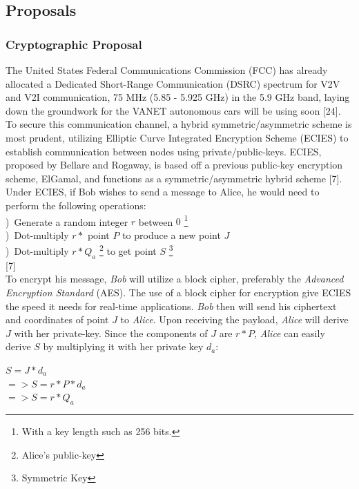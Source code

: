 \documentclass[conference,compsoc]{IEEEtran}
\begin{document}
\subsection{Proposals}
\subsubsection{Cryptographic Proposal}
The United States Federal Communications Commission (FCC) has already allocated a Dedicated Short-Range Communication (DSRC) spectrum for V2V and V2I communication, 75 MHz (5.85 - 5.925 GHz) in the 5.9 GHz band, laying down the groundwork for the VANET autonomous cars will be using soon [24]. To secure this communication channel, a hybrid symmetric/asymmetric scheme is most prudent, utilizing Elliptic Curve Integrated Encryption Scheme (ECIES) to establish communication between nodes using private/public-keys. ECIES, proposed by Bellare and Rogaway, is based off a previous public-key encryption scheme, ElGamal, and functions as a symmetric/asymmetric hybrid scheme [7]. Under ECIES, if Bob wishes to send a message to Alice, he would need to perform the following operations:\\
\break
{})~Generate a random integer $r$ between $0$ \footnote{With a key length such as 256 bits.}\\ %
)~Dot-multiply $r *$ point $P$ to produce a new point $J$\\ 
)~Dot-multiply $r * Q_a$ \footnote{Alice’s public-key} to get point $S$ \footnote{Symmetric Key}\\

\hfill [7]\\

To encrypt his message, \emph{Bob} will utilize a block cipher, preferably the \emph{Advanced Encryption Standard} (AES). The use of a block cipher for encryption give ECIES the speed it needs for real-time applications. \emph{Bob} then will send his ciphertext and coordinates of point $J$ to \emph{Alice}. Upon receiving the payload, \emph{Alice} will derive $J$ with her private-key. Since the components of $J$ are $r * P$, \emph{Alice} can easily derive $S$ by multiplying it with her private key $d_a$:\\

\begin{center}
\large $S = J * d_a$\\ $=> S = r * P * d_a$ \\ $=> S = r * Q_a$
\break
\end{center}
\end{document}
